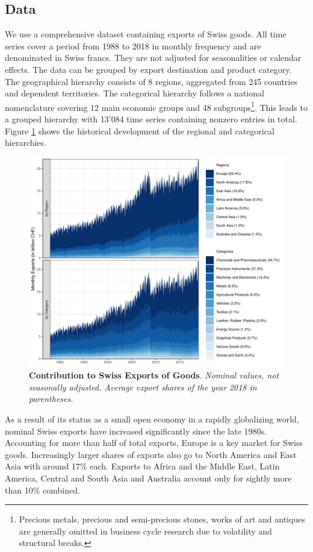\documentclass[a4paper,fleqn,11pt]{article}
\begin{document}
\subsection{Data}
We use a comprehensive dataset containing exports of Swiss goods. All time series cover a period from 1988 to 2018 in monthly frequency and are denominated in Swiss francs. They are not adjusted for seasonalities or calendar effects. The data can be grouped by export destination and product category. The geographical hierarchy consists of 8 regions, aggregated from 245 countries and dependent territories. The categorical hierarchy follows a national nomenclature covering 12 main economic groups and 48 subgroups\footnote{Precious metals, precious and semi-precious stones, works of art and antiques are generally omitted in business cycle research due to volatility and structural breaks.}. This leads to a grouped hierarchy with 13'084 time series containing nonzero entries in total. Figure \ref{fig:area} shows the historical development of the regional and categorical hierarchies.
\begin{figure}[H]
	\includegraphics[width=\textwidth]{fig/fig_area}
	\caption[Contribution to Swiss Exports of Goods]{\textbf{Contribution to Swiss Exports of Goods}. \textit{Nominal values, not seasonally adjusted. Average export shares of the year 2018 in parentheses.}}\label{fig:area}
\end{figure}
As a result of its status as a small open economy in a rapidly globalizing world, nominal Swiss exports have increased significantly since the late 1980s. Accounting for more than half of total exports, Europe is a key market for Swiss goods. Increasingly larger shares of exports also go to North America and East Asia with around 17\% each. Exports to Africa and the Middle East, Latin America, Central and South Asia and Australia account only for sightly more than 10\% combined.
\end{document}
